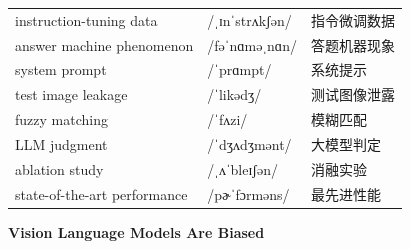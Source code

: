 \documentclass[UTF8,12pt,a4paper]{ctexart}
\providecommand{\zh}[1]{#1}
\begin{document}
\begin{tabular*}{\textwidth}{@{\extracolsep{\fill}}lll@{}}
instruction-tuning data & {\ipafont /ˌɪnˈstrʌkʃən/} & \zh{指令微调数据} \\
answer machine phenomenon & {\ipafont /fəˈnɑməˌnɑn/} & \zh{答题机器现象} \\
system prompt & {\ipafont /ˈprɑmpt/} & \zh{系统提示} \\
test image leakage & {\ipafont /ˈlikədʒ/} & \zh{测试图像泄露} \\
fuzzy matching & {\ipafont /ˈfʌzi/} & \zh{模糊匹配} \\
LLM judgment & {\ipafont /ˈdʒʌdʒmənt/} & \zh{大模型判定} \\
ablation study & {\ipafont /ˌʌˈbleɪʃən/} & \zh{消融实验} \\
state-of-the-art performance & {\ipafont /pɚˈfɔrməns/} & \zh{最先进性能} \\
\bottomrule
\end{tabular*}

\newpage

\begin{center}
    {\Large\bfseries Vision Language Models Are Biased}
\end{center}
\end{document}
